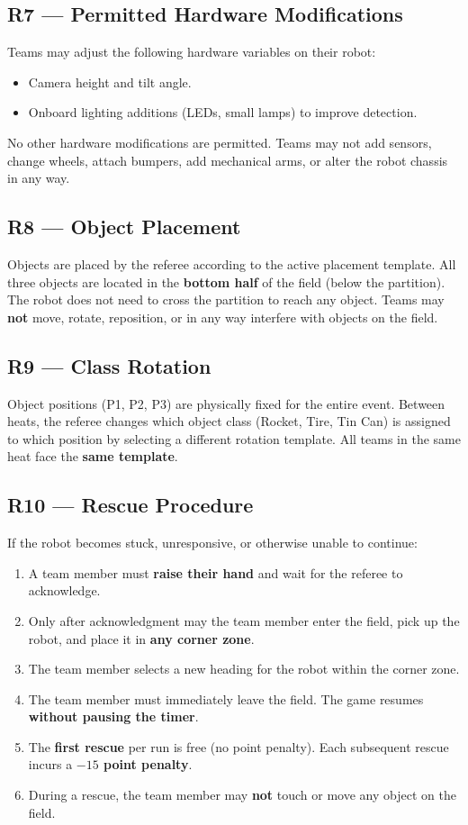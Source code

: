 \documentclass[a4]{article}
\begin{document}
\subsection*{R7 --- Permitted Hardware Modifications}
Teams may adjust the following hardware variables on their robot:
\begin{itemize}
    \item Camera height and tilt angle.
    \item Onboard lighting additions (LEDs, small lamps) to improve detection.
\end{itemize}
No other hardware modifications are permitted. Teams may not add sensors, change wheels, attach bumpers, add mechanical arms, or alter the robot chassis in any way.

\subsection*{R8 --- Object Placement}
Objects are placed by the referee according to the active placement template. All three objects are located in the \textbf{bottom half} of the field (below the partition). The robot does not need to cross the partition to reach any object. Teams may \textbf{not} move, rotate, reposition, or in any way interfere with objects on the field.

\subsection*{R9 --- Class Rotation}
Object positions (P1, P2, P3) are physically fixed for the entire event. Between heats, the referee changes which object class (Rocket, Tire, Tin Can) is assigned to which position by selecting a different rotation template. All teams in the same heat face the \textbf{same template}.

\subsection*{R10 --- Rescue Procedure}
If the robot becomes stuck, unresponsive, or otherwise unable to continue:
\begin{enumerate}[label=\arabic*.]
    \item A team member must \textbf{raise their hand} and wait for the referee to acknowledge.
    \item Only after acknowledgment may the team member enter the field, pick up the robot, and place it in \textbf{any corner zone}.
    \item The team member selects a new heading for the robot within the corner zone.
    \item The team member must immediately leave the field. The game resumes \textbf{without pausing the timer}.
    \item The \textbf{first rescue} per run is free (no point penalty). Each subsequent rescue incurs a \textbf{$-15$ point penalty}.
    \item During a rescue, the team member may \textbf{not} touch or move any object on the field.
\end{enumerate}
\end{document}
